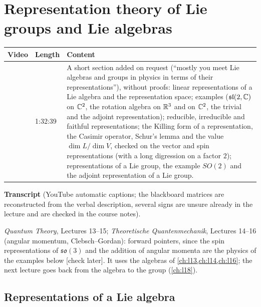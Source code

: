 \chapter{Representation theory of Lie groups and Lie algebras}\label{ch:l17}
\begin{paracol}{2}

\begin{sources}
\begin{tabularx}{\linewidth}{@{}l l L@{}}
\toprule
\textbf{Video} & \textbf{Length} & \textbf{Content}\\
\midrule
{} & 1:32:39 & A short section added on request (``mostly you meet Lie algebras and groups in physics in terms of their representations''), without proofs: linear representations of a Lie algebra and the representation space; examples ($\mathfrak{sl}(2,\mathbb{C})$ on $\mathbb{C}^2$, the rotation algebra on $\mathbb{R}^3$ and on $\mathbb{C}^2$, the trivial and the adjoint representation); reducible, irreducible and faithful representations; the Killing form of a representation, the Casimir operator, Schur's lemma and the value $\dim L/\dim V$, checked on the vector and spin representations (with a long digression on a factor $2$); representations of a Lie group, the example $SO(2)$ and the adjoint representation of a Lie group.\\
\bottomrule
\end{tabularx}

\smallskip
\textbf{Transcript}  (YouTube automatic captions; the blackboard matrices are reconstructed from the verbal description, several signs are unsure already in the lecture and are checked in the course notes).
\end{sources}

\begin{reading}
\emph{Quantum Theory}, Lectures 13--15; \emph{Theoretische Quantenmechanik}, Lectures 14--16 (angular momentum, Clebsch--Gordan): forward pointers, since the spin representations of $\mathfrak{so}(3)$ and the addition of angular momenta are the physics of the examples below [check later]. It uses the algebras of \cref{ch:l13,ch:l14,ch:l16}; the next lecture goes back from the algebra to the group (\cref{ch:l18}).
\end{reading}

\section{Representations of a Lie algebra}\label{sec:rp-algebra}


\end{paracol}

